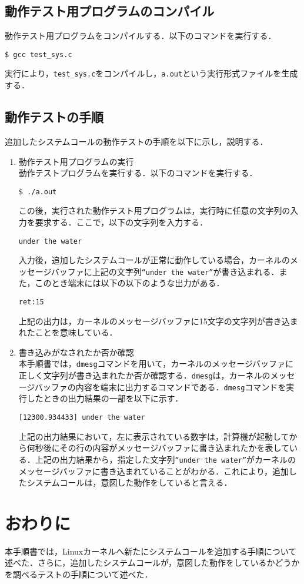 \documentclass[12pt]{jsarticle}
\begin{document}
\subsection{動作テスト用プログラムのコンパイル}
動作テスト用プログラムをコンパイルする．以下のコマンドを実行する．
\begin{verbatim}
$ gcc test_sys.c
\end{verbatim}
実行により，\verb|test_sys.c|をコンパイルし，\verb|a.out|という実行形式ファイルを生成する．
\subsection{動作テストの手順}
追加したシステムコールの動作テストの手順を以下に示し，説明する．
\begin{enumerate}
\item 動作テスト用プログラムの実行\\
  動作テストプログラムを実行する．以下のコマンドを実行する．
\begin{verbatim}
$ ./a.out
\end{verbatim}
この後，実行された動作テスト用プログラムは，実行時に任意の文字列の入力を要求する．ここで，以下の文字列を入力する．
\begin{verbatim}
under the water
\end{verbatim}
入力後，追加したシステムコールが正常に動作している場合，カーネルのメッセージバッファに上記の文字列\verb|“under the water”|が書き込まれる．また，このとき端末には以下の以下のような出力がある．
\begin{verbatim}
ret:15
\end{verbatim}
上記の出力は，カーネルのメッセージバッファに15文字の文字列が書き込まれたことを意味している．
\item 書き込みがなされたか否か確認\\
  本手順書では，\verb|dmesg|コマンドを用いて，カーネルのメッセージバッファに正しく文字列が書き込まれたか否か確認する．\verb|dmesg|は，カーネルのメッセージバッファの内容を端末に出力するコマンドである．\verb|dmesg|コマンドを実行したときの出力結果の一部を以下に示す．
\begin{verbatim}
[12300.934433] under the water
\end{verbatim}
上記の出力結果において，左に表示されている数字は，計算機が起動してから何秒後にその行の内容がメッセージバッファに書き込まれたかを表している．上記の出力結果から，指定した文字列\verb|“under the water”|がカーネルのメッセージバッファに書き込まれていることがわかる．これにより，追加したシステムコールは，意図した動作をしていると言える．
\end{enumerate}
\section{おわりに}
本手順書では，Linuxカーネルへ新たにシステムコールを追加する手順について述べた．さらに，追加したシステムコールが，意図した動作をしているかどうかを調べるテストの手順について述べた．



\end{document}
